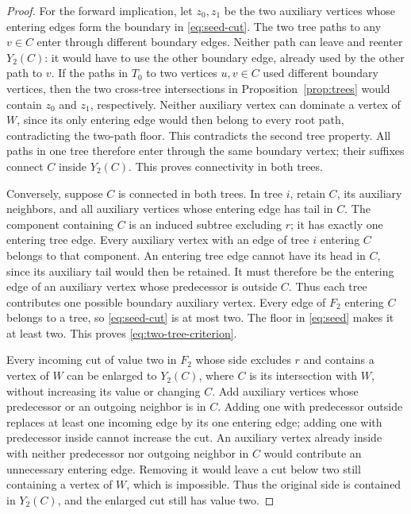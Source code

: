 \documentclass[11pt]{article}
\theoremstyle{definition}
\theoremstyle{remark}
\begin{document}
\begin{proof}
For the forward implication, let \(z_0,z_1\) be the two auxiliary vertices whose entering edges form the boundary in \eqref{eq:seed-cut}. The two tree paths to any \(v\in C\) enter through different boundary edges. Neither path can leave and reenter \(Y_2(C)\): it would have to use the other boundary edge, already used by the other path to \(v\). If the paths in \(T_0\) to two vertices \(u,v\in C\) used different boundary vertices, then the two cross-tree intersections in Proposition~\ref{prop:trees} would contain \(z_0\) and \(z_1\), respectively. Neither auxiliary vertex can dominate a vertex of \(W\), since its only entering edge would then belong to every root path, contradicting the two-path floor. This contradicts the second tree property. All paths in one tree therefore enter through the same boundary vertex; their suffixes connect \(C\) inside \(Y_2(C)\). This proves connectivity in both trees.

Conversely, suppose \(C\) is connected in both trees. In tree \(i\), retain \(C\), its auxiliary neighbors, and all auxiliary vertices whose entering edge has tail in \(C\). The component containing \(C\) is an induced subtree excluding \(r\); it has exactly one entering tree edge. Every auxiliary vertex with an edge of tree \(i\) entering \(C\) belongs to that component. An entering tree edge cannot have its head in \(C\), since its auxiliary tail would then be retained. It must therefore be the entering edge of an auxiliary vertex whose predecessor is outside \(C\). Thus each tree contributes one possible boundary auxiliary vertex. Every edge of \(F_2\) entering \(C\) belongs to a tree, so \eqref{eq:seed-cut} is at most two. The floor in \eqref{eq:seed} makes it at least two. This proves \eqref{eq:two-tree-criterion}.

Every incoming cut of value two in \(F_2\) whose side excludes \(r\) and contains a vertex of \(W\) can be enlarged to \(Y_2(C)\), where \(C\) is its intersection with \(W\), without increasing its value or changing \(C\). Add auxiliary vertices whose predecessor or an outgoing neighbor is in \(C\). Adding one with predecessor outside replaces at least one incoming edge by its one entering edge; adding one with predecessor inside cannot increase the cut. An auxiliary vertex already inside with neither predecessor nor outgoing neighbor in \(C\) would contribute an unnecessary entering edge. Removing it would leave a cut below two still containing a vertex of \(W\), which is impossible. Thus the original side is contained in \(Y_2(C)\), and the enlarged cut still has value two.


\end{proof}
\end{document}
